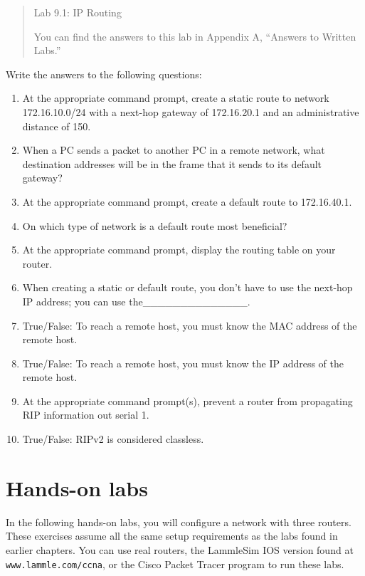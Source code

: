 \begin{quote}
Lab 9.1: IP Routing

You can find the answers to this lab in Appendix A, ``Answers to Written
Labs.''
\end{quote}

Write the answers to the following questions:

\begin{enumerate}
\item
  At the appropriate command prompt, create a static route to network
  172.16.10.0/24 with a next-hop gateway of 172.16.20.1 and an
  administrative distance of 150.
\item
  When a PC sends a packet to another PC in a remote network, what
  destination addresses will be in the frame that it sends to its
  default gateway?
\item
  At the appropriate command prompt, create a default route to
  172.16.40.1.
\item
  On which type of network is a default route most beneficial?
\item
  At the appropriate command prompt, display the routing table on your
  router.
\item
  When creating a static or default route, you don't have to use the
  next-hop IP address; you can use the\_\_\_\_\_\_\_\_\_\_\_\_\_\_.
\item
  True/False: To reach a remote host, you must know the MAC address of
  the remote host.
\item
  \protect\hypertarget{c09.xhtmlux5cux23Page_401}{}{}True/False: To
  reach a remote host, you must know the IP address of the remote host.
\item
  At the appropriate command prompt(s), prevent a router from
  propagating RIP information out serial 1.
\item
  True/False: RIPv2 is considered classless.
\end{enumerate}




\section{Hands-on labs}

In the following hands-on labs, you will configure a network with three
routers. These exercises assume all the same setup requirements as the
labs found in earlier chapters. You can use real routers, the LammleSim
IOS version found at \texttt{www.lammle.com/ccna}, or the Cisco Packet
Tracer program to run these labs.

